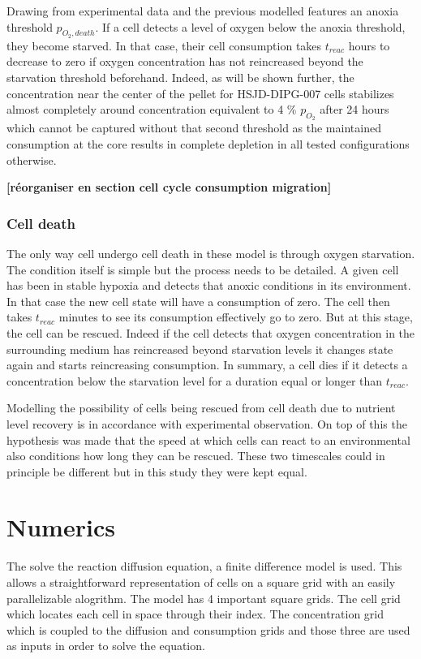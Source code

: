 \documentclass[11pt,a4paper]{article}
\begin{document}
Drawing from experimental data and the previous modelled features an anoxia threshold $p_{O_2,death}$. If a cell detects a level of oxygen below the anoxia threshold, they become starved. In that case, their cell consumption takes $t_{reac}$ hours to decrease to zero if oxygen concentration has not reincreased beyond the starvation threshold beforehand. Indeed, as will be shown further, the concentration near the center of the pellet for HSJD-DIPG-007 cells stabilizes almost completely around  concentration equivalent to 4 \% $p_{O_2}$ after 24 hours which cannot be captured without that second threshold as the maintained consumption at the core results in complete depletion in all tested configurations otherwise.  

\textbf{[réorganiser en section cell cycle consumption migration]
}

\subsubsection{Cell death} 
The only way cell undergo cell death in these model is through oxygen starvation. The condition itself is simple but the process needs to be detailed. A given cell has been in stable hypoxia and detects that anoxic conditions in its environment. In that case the new cell state will have a consumption of zero. The cell then takes $t_{reac}$ minutes to see its consumption effectively go to zero. But at this stage, the cell can be rescued. Indeed if the cell detects that oxygen concentration in the surrounding medium has reincreased beyond starvation levels it changes state again and starts reincreasing consumption. In summary, a cell dies if it detects a concentration below the starvation level for a duration equal or longer than $t_{reac}$.

Modelling the possibility of cells being rescued from cell death due to nutrient level recovery is in accordance with experimental observation. On top of this the hypothesis was made that the speed at which cells can react to an environmental also conditions how long they can be rescued. These two timescales could in principle be different but in this study they were kept equal.

\section{Numerics}
The solve the reaction diffusion equation, a finite difference model is used. This allows a straightforward representation of cells on a square grid with an easily parallelizable alogrithm. The model has 4 important square grids. The cell grid which locates each cell in space through their index. The concentration grid which is coupled to the diffusion and consumption grids and those three are used as inputs in order to solve the equation.
\end{document}
